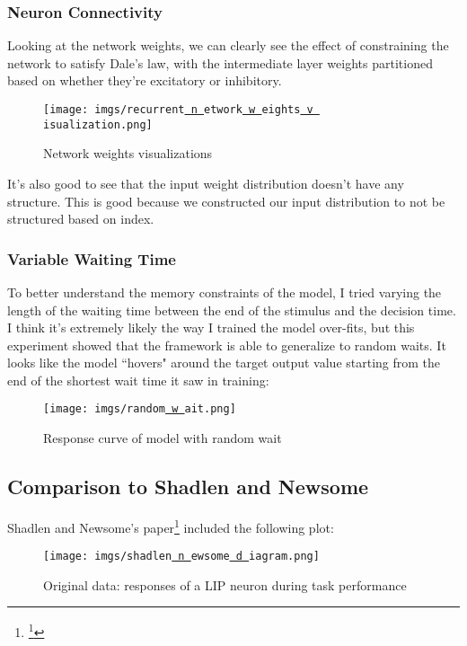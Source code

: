 \documentclass[11pt]{article}
\renewcommand{\_}[1]{\underline{ #1 }}
\theoremstyle{definition}
\begin{document}
\subsubsection{Neuron Connectivity}

Looking at the network weights, we can clearly see the effect of constraining the network to satisfy Dale's law, with the intermediate layer weights partitioned based on whether they're excitatory or inhibitory.

\begin{figure}[H]
  \centering
  \texttt{[image: imgs/recurrent\_network\_weights\_visualization.png]}
  \caption{Network weights visualizations}
\end{figure}

It's also good to see that the input weight distribution doesn't have any structure. This is good because we constructed our input distribution to not be structured based on index.

\subsubsection{Variable Waiting Time}

To better understand the memory constraints of the model, I tried varying the length of the waiting time between the end of the stimulus and the decision time. I think it's extremely likely the way I trained the model over-fits, but this experiment showed that the framework is able to generalize to random waits. It looks like the model ``hovers" around the target output value starting from the end of the shortest wait time it saw in training:

\begin{figure}[H]
  \centering
  \texttt{[image: imgs/random\_wait.png]}
  \caption{Response curve of model with random wait}
\end{figure}


\subsection{Comparison to Shadlen and Newsome}

Shadlen and Newsome's paper\footnote{\footnote{Paper: \url{https://www.pnas.org/content/pnas/93/2/628.full.pdf}}} included the following plot:

\begin{figure}[H]
  \centering
  \texttt{[image: imgs/shadlen\_newsome\_diagram.png]}
  \caption{Original data: responses of a LIP neuron during task performance}
\end{figure}
\end{document}
